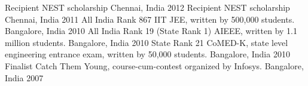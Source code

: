\begin{cvhonors}
	\cvhonor
	{Recipient}
	{NEST scholarship}
	{Chennai, India}
	{2012}
	\cvhonor
	{Recipient}
	{NEST scholarship}
	{Chennai, India}
	{2011}
	\cvhonor
	{All India Rank 867}
	{IIT JEE, written by 500,000 students.}
	{Bangalore, India}
	{2010}
	\cvhonor
	{All India Rank 19 (State Rank 1)}
	{AIEEE, written by 1.1 million students.}
	{Bangalore, India}
	{2010}
	\cvhonor
	{State Rank 21}
	{CoMED-K, state level engineering entrance exam, written by 50,000 students.}
	{Bangalore, India}
	{2010}
	\cvhonor
	{Finalist}
	{Catch Them Young, course-cum-contest organized by Infosys.}
	{Bangalore, India}
	{2007}
\end{cvhonors}
